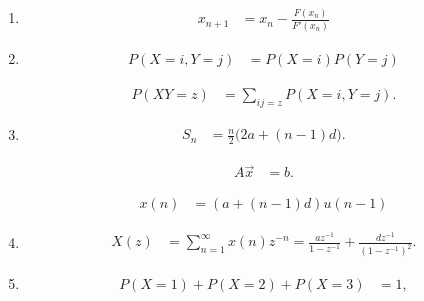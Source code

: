 \begin{enumerate}[label=\thesubsection.\arabic*, ref=\thesubsection.\theenumi, leftmargin=12mm, itemsep=4pt]

    \setcounter{enumi}{0}
    \item[\ref{question-short:C10-Q01}]
    \begin{align}
        x_{n+1} &= x_n-\frac{F(x_n)}{F'(x_n)}
        \label{formula:C10-Q01-F02}
    \end{align}

    \setcounter{enumi}{1}
    \item[\ref{question-short:C10-Q03}]
    \begin{align}
        P(X=i,Y=j) &= P(X=i)P(Y=j)
        \label{formula:C10-Q03-F01}
    \end{align}

    \begin{align}
        P(XY=z) &= \sum_{ij=z}P(X=i,Y=j).
        \label{formula:C10-Q03}
    \end{align}

    \setcounter{enumi}{2}
    \item[\ref{question-short:C10-Q08}]
    \begin{align}
        S_n &= \frac n2\bigl(2a+(n-1)d\bigr).
        \label{formula:C10-Q08-F01}
    \end{align}

    \begin{align}
	A\vec{x} &= b.
        \label{formula:C10-Q08}
    \end{align}

    \begin{align}
	    x(n) &=(a+(n-1)d)u(n-1)
	     \label{formula:C10-Q08-F03}
    \end{align}

    \setcounter{enumi}{4}
    \item[\ref{question-short:C10-Q11}]
    \begin{align}
	    X(z) &= \sum_{n=1}^{\infty}x(n)z^{-n}
        = \frac{az^{-1}}{1-z^{-1}}
        + \frac{dz^{-1}}{(1-z^{-1})^2}.
        \label{formula:C10-Q11}
    \end{align}

    \setcounter{enumi}{5}
    \item[\ref{question-short:C10-Q15}]
    \begin{align}
	    	P(X=1)+P(X=2)+P(X=3) &= 1,
        \label{formula:C10-Q15}
    \end{align}


\end{enumerate}
